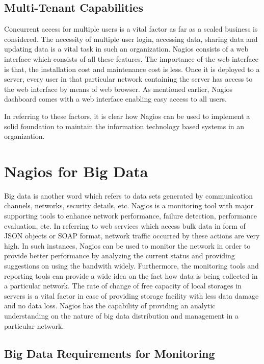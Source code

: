 \documentclass[9pt,twocolumn,twoside]{../../styles/osajnl}
\begin{document}
\subsection{Multi-Tenant Capabilities}

Concurrent access for multiple users is a vital factor as far as a
scaled business is considered. The necessity of multiple user login,
accessing data, sharing data and updating data is a vital task in such
an organization. Nagios consists of a web interface which consists of
all these features. The importance of the web interface is that, the
installation cost and maintenance cost is less. Once it is deployed to
a server, every user in that particular network containing the server
has access to the web interface by means of web browser. As mentioned
earlier, Nagios dashboard comes with a web interface enabling easy
access to all users.

In referring to these factors, it is clear how Nagios can be used to
implement a solid foundation to maintain the information technology
based systems in an organization.

\section{Nagios for Big Data}

Big data is another word which refers to data sets generated by
communication channels, networks, security details, etc. Nagios is a
monitoring tool with major supporting tools to enhance network
performance, failure detection, performance evaluation, etc. In
referring to web services which access bulk data in form of JSON
objects or SOAP format, network traffic occurred by these actions are
very high. In such instances, Nagios can be used to monitor the
network in order to provide better performance by analyzing the
current status and providing suggestions on using the bandwith
widely. Furthermore, the monitoring tools and reporting tools can
provide a wide idea on the fact how data is being collected in a
particular network. The rate of change of free capacity of local
storages in servers is a vital factor in case of providing storage
facility with less data damage and no data loss. Nagios has the
capability of providing an analytic understanding on the nature of big
data distribution and management in a particular network.

\subsection{Big Data Requirements for Monitoring}
\end{document}
